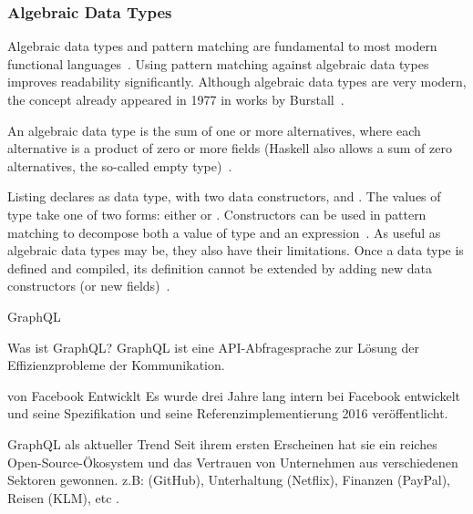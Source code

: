 \begin{frame}\frametitle{Algebraic Data Types}

Algebraic data types and pattern matching are fundamental to most modern functional languages~\cite{trees-that-grow}. Using pattern matching against algebraic data types improves readability significantly. Although algebraic data types are very modern, the concept already appeared in 1977 in works by Burstall~\cite{history-of-haskell}.
    
An algebraic data type is the sum of one or more alternatives, where each alternative is a product of zero or more fields (Haskell also allows a sum of zero alternatives, the so-called empty type)~\cite{history-of-haskell}. 

Listing  declares  as data type, with two data constructors,  and . The values of type  take one of two forms: either  or . Constructors can be used in pattern matching to decompose both a value of type and an expression~\cite{history-of-haskell}. As useful as algebraic data types may be, they also have their limitations. Once a data type is defined and compiled, its definition cannot be extended by adding new data constructors (or new fields)~\cite{trees-that-grow}.
    

\end{frame}


\begin{frame}{GraphQL}

    \footnotesize

    \begin{block}{Was ist GraphQL?}
        GraphQL ist eine API-Abfragesprache zur Lösung der Effizienzprobleme der Kommunikation\cite{gql-iot}.         
    \end{block}

    \begin{block}{von Facebook Entwicklt}
        Es wurde drei Jahre lang intern bei Facebook entwickelt und seine Spezifikation und seine Referenzimplementierung 2016 veröffentlicht.
        \cite{initial-analysis-of-gql}
    \end{block}

    \begin{block}{GraphQL als aktueller Trend}
        Seit ihrem ersten Erscheinen hat sie ein reiches Open-Source-Ökosystem und das Vertrauen von Unternehmen aus verschiedenen Sektoren gewonnen. z.B: (GitHub), Unterhaltung (Netflix), Finanzen (PayPal), Reisen (KLM), etc \cite{morph-gql-1,gql-healthcare}.
    \end{block}

\end{frame}






